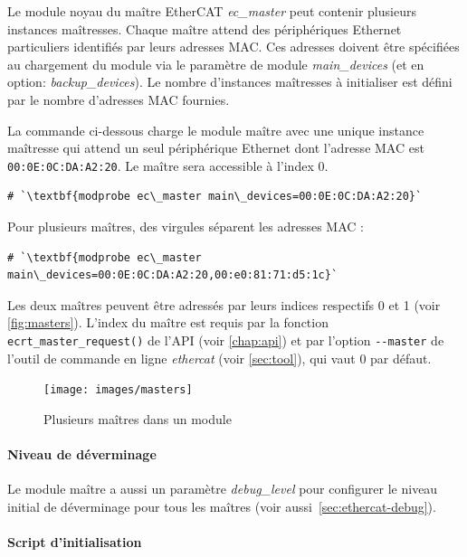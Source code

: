 \documentclass[a4paper,12pt,BCOR=6mm,bibtotoc,idxtotoc]{scrbook}
\begin{document}
Le module noyau du ma\^itre EtherCAT \textit{ec\_master} peut contenir
plusieurs instances ma\^itresses. Chaque ma\^itre attend des
p\'eriph\'eriques Ethernet particuliers identifi\'es par leurs adresses
MAC. Ces adresses doivent \^etre sp\'ecifi\'ees au
chargement du module via le param\`etre de module
\textit{main\_devices} (et en option: \textit{backup\_devices}). Le
nombre d'instances ma\^itresses \`a initialiser est d\'efini par le
nombre d'adresses MAC fournies.

La commande ci-dessous charge le module ma\^itre avec une unique
instance ma\^itresse qui attend un seul p\'eriph\'erique Ethernet dont
l'adresse MAC est \lstinline+00:0E:0C:DA:A2:20+. Le ma\^itre sera
accessible \`a l'index $0$.

\begin{lstlisting}
# `\textbf{modprobe ec\_master main\_devices=00:0E:0C:DA:A2:20}`
\end{lstlisting}

Pour plusieurs ma\^itres, des virgules s\'eparent les adresses MAC :

\begin{lstlisting}
# `\textbf{modprobe ec\_master main\_devices=00:0E:0C:DA:A2:20,00:e0:81:71:d5:1c}`
\end{lstlisting}

Les deux ma\^itres peuvent \^etre adress\'es par leurs indices
respectifs 0 et 1 (voir \autoref{fig:masters}). L'index du ma\^itre
est requis par la fonction \lstinline+ecrt_master_request()+ de l'API
(voir \autoref{chap:api}) et par l'option \lstinline+--master+ de
l'outil de commande en ligne \textit{ethercat} (voir
\autoref{sec:tool}), qui vaut $0$ par d\'efaut.

\begin{figure}[htbp]
  \centering
  \texttt{[image: images/masters]}
  \caption{Plusieurs ma\^itres dans un module}
  \label{fig:masters}
\end{figure}

\paragraph{Niveau de d\'everminage} Le module ma\^itre a aussi un
param\`etre \textit{debug\_level} pour configurer le niveau initial de
d\'everminage pour tous les ma\^itres (voir
aussi~\autoref{sec:ethercat-debug}).

\paragraph{Script d'initialisation}
\end{document}
